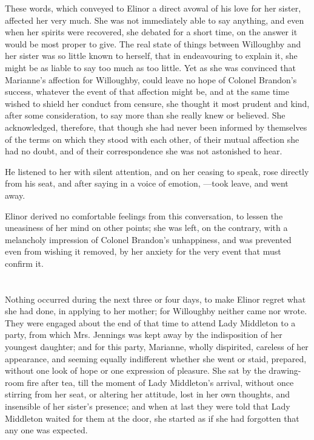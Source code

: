 These words, which conveyed to Elinor a direct avowal of his love for her sister, affected her very much. She was not immediately able to say anything, and even when her spirits were recovered, she debated for a short time, on the answer it would be most proper to give. The real state of things between Willoughby and her sister was so little known to herself, that in endeavouring to explain it, she might be as liable to say too much as too little. Yet as she was convinced that Marianne's affection for Willoughby, could leave no hope of Colonel Brandon's success, whatever the event of that affection might be, and at the same time wished to shield her conduct from censure, she thought it most prudent and kind, after some consideration, to say more than she really knew or believed. She acknowledged, therefore, that though she had never been informed by themselves of the terms on which they stood with each other, of their mutual affection she had no doubt, and of their correspondence she was not astonished to hear.

He listened to her with silent attention, and on her ceasing to speak, rose directly from his seat, and after saying in a voice of emotion, ---took leave, and went away.

Elinor derived no comfortable feelings from this conversation, to lessen the uneasiness of her mind on other points; she was left, on the contrary, with a melancholy impression of Colonel Brandon's unhappiness, and was prevented even from wishing it removed, by her anxiety for the very event that must confirm it.

\chapter{} %

Nothing occurred during the next three or four days, to make Elinor regret what she had done, in applying to her mother; for Willoughby neither came nor wrote. They were engaged about the end of that time to attend Lady Middleton to a party, from which Mrs. Jennings was kept away by the indisposition of her youngest daughter; and for this party, Marianne, wholly dispirited, careless of her appearance, and seeming equally indifferent whether she went or staid, prepared, without one look of hope or one expression of pleasure. She sat by the drawing-room fire after tea, till the moment of Lady Middleton's arrival, without once stirring from her seat, or altering her attitude, lost in her own thoughts, and insensible of her sister's presence; and when at last they were told that Lady Middleton waited for them at the door, she started as if she had forgotten that any one was expected.

